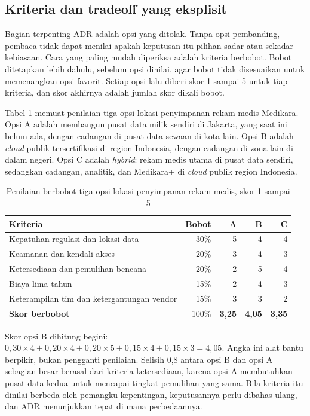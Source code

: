 \subsection*{Kriteria dan tradeoff yang eksplisit}

Bagian terpenting ADR adalah opsi yang ditolak. Tanpa opsi pembanding,
pembaca tidak dapat menilai apakah keputusan itu pilihan sadar atau sekadar
kebiasaan. Cara yang paling mudah diperiksa adalah kriteria berbobot. Bobot
ditetapkan lebih dahulu, sebelum opsi dinilai, agar bobot tidak disesuaikan
untuk memenangkan opsi favorit. Setiap opsi lalu diberi skor 1 sampai 5 untuk
tiap kriteria, dan skor akhirnya adalah jumlah skor dikali bobot.

Tabel \ref{tab:ch10-skor-opsi} memuat penilaian tiga opsi lokasi penyimpanan
rekam medis Medikara. Opsi A adalah membangun pusat data milik sendiri di Jakarta,
yang saat ini belum ada, dengan cadangan di pusat data sewaan di kota lain. Opsi B adalah \textit{cloud}
publik tersertifikasi di region Indonesia, dengan cadangan di zona lain di
dalam negeri. Opsi C adalah \textit{hybrid}: rekam medis utama di pusat data
sendiri, sedangkan cadangan, analitik, dan Medikara+ di \textit{cloud} publik
region Indonesia.

\begin{table}[!htb]
  \centering
  \caption{Penilaian berbobot tiga opsi lokasi penyimpanan rekam medis, skor 1
           sampai 5}
  \label{tab:ch10-skor-opsi}
  \small
  \begin{tabularx}{\textwidth}{Xrrrr}
    \hline
    \textbf{Kriteria} & \textbf{Bobot} & \textbf{A} & \textbf{B} & \textbf{C} \\
    \hline
    Kepatuhan regulasi dan lokasi data & 30\% & 5 & 4 & 4 \\
    \hline
    Keamanan dan kendali akses & 20\% & 3 & 4 & 3 \\
    \hline
    Ketersediaan dan pemulihan bencana & 20\% & 2 & 5 & 4 \\
    \hline
    Biaya lima tahun & 15\% & 2 & 4 & 3 \\
    \hline
    Keterampilan tim dan ketergantungan vendor & 15\% & 3 & 3 & 2 \\
    \hline
    \textbf{Skor berbobot} & 100\% & \textbf{3,25} & \textbf{4,05} & \textbf{3,35} \\
    \hline
  \end{tabularx}
\end{table}

Skor opsi B dihitung begini: $0{,}30 \times 4 + 0{,}20 \times 4 + 0{,}20
\times 5 + 0{,}15 \times 4 + 0{,}15 \times 3 = 4{,}05$. Angka ini alat bantu
berpikir, bukan pengganti penilaian. Selisih 0,8 antara opsi B dan opsi A
sebagian besar berasal dari kriteria ketersediaan, karena opsi A membutuhkan
pusat data kedua untuk mencapai tingkat pemulihan yang sama. Bila kriteria itu
dinilai berbeda oleh pemangku kepentingan, keputusannya perlu dibahas ulang,
dan ADR menunjukkan tepat di mana perbedaannya.

